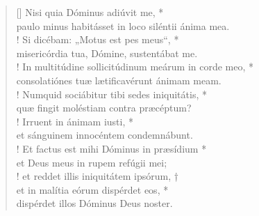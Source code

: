 \begin{verse}[\versewidth]
Nisi quia Dóminus adiúvit me, *\\
paulo minus habitásset in loco siléntii ánima mea.\\!
\vin Si dicébam: „Motus est pes meus“, *\\
\vin misericórdia tua, Dómine, sustentábat me.\\!
In multitúdine sollicitúdinum meárum in corde meo, *\\
consolatiónes tuæ lætificavérunt ánimam meam.\\!
\vin Numquid sociábitur tibi sedes iniquitátis, *\\
\vin quæ fingit moléstiam contra præcéptum?\\!
Irruent in ánimam iusti, *\\
et sánguinem innocéntem condemnábunt.\\!
\vin Et factus est mihi Dóminus in præsídium *\\
\vin et Deus meus in rupem refúgii mei;\\!
et reddet illis iniquitátem ipsórum, †\\
et in malítia eórum dispérdet eos, *\\
dispérdet illos Dóminus Deus noster.\\
\end{verse}
\vspace{1cm}


